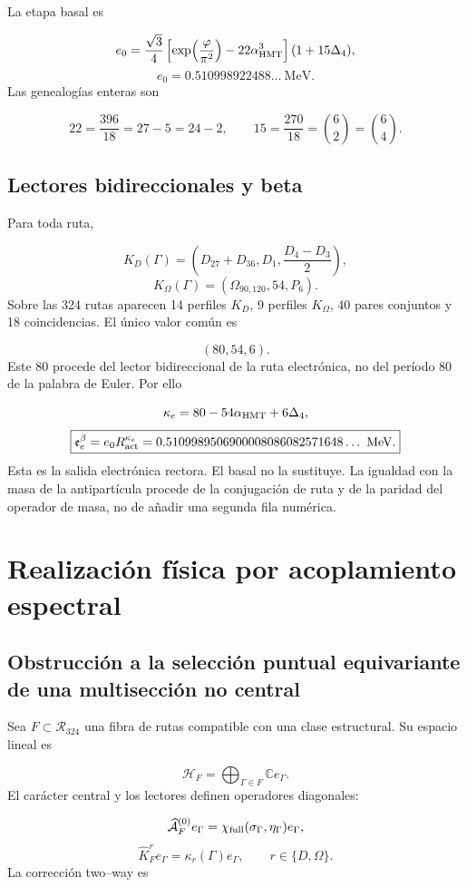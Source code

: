 La etapa basal es

\[
 e_0=\frac{\sqrt3}{4}
 \left[\exp\!\left(\frac{\varphi}{\pi^2}\right)
 -22\alpha_{\rm HMT}^3\right](1+15\Delta_4),
\]
\[
 e_0=0.510998922488\ldots\ \mathrm{MeV}.
\]
Las genealogías enteras son

\[
 22=\frac{396}{18}=27-5=24-2,
 \qquad
 15=\frac{270}{18}=\binom62=\binom64.
\]
\subsection{Lectores bidireccionales y beta}
Para toda ruta,

\[
 K_D(\Gamma)=\left(D_{27}+D_{36},D_1,\frac{D_4-D_3}{2}\right),
\]
\[
 K_\Omega(\Gamma)=(\Omega_{90,120},54,P_6).
\]
Sobre las 324 rutas aparecen 14 perfiles \(K_D\), 9 perfiles \(K_\Omega\), 40 pares conjuntos y 18 coincidencias. El único valor común es

\[
 (80,54,6).
\]
Este 80 procede del lector bidireccional de la ruta electrónica, no del período 80 de la palabra de Euler. Por ello

\[
 \kappa_e=80-54\alpha_{\rm HMT}+6\Delta_4,
\]
\[
 \boxed{
 \mathfrak e_e^\beta=e_0R_{\rm act}^{\kappa_e}
 =0.5109989506900008086082571648\ldots\ \mathrm{MeV}.}
\]
Esta es la salida electrónica rectora. El basal no la sustituye. La igualdad con la masa de la antipartícula procede de la conjugación de ruta y de la paridad del operador de masa, no de añadir una segunda fila numérica.

\section{Realización física por acoplamiento espectral}
\subsection{Obstrucción a la selección puntual equivariante de una multisección no central}
Sea \(F\subset\mathcal R_{324}\) una fibra de rutas compatible con una clase estructural. Su espacio lineal es

\[
 \mathcal H_F=\bigoplus_{\Gamma\in F}\mathbb C e_\Gamma.
\]
El carácter central y los lectores definen operadores diagonales:

\[
 \widehat{\mathcal A}_F^{(0)}e_\Gamma
 =\chi_{\rm full}(\sigma_\Gamma,\eta_\Gamma)e_\Gamma,
\]
\[
 \widehat K_F^r e_\Gamma=\kappa_r(\Gamma)e_\Gamma,
 \qquad r\in\{D,\Omega\}.
\]
La corrección two--way es

